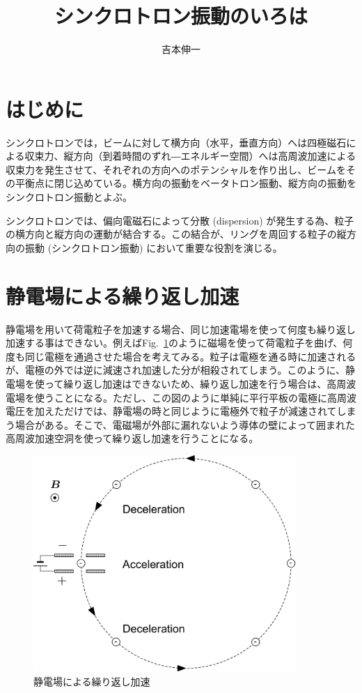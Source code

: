 \documentclass[10pt,a4paper]{ltjsarticle}
\begin{document}
\title{シンクロトロン振動のいろは}
\author{吉本伸一}
\maketitle
\tableofcontents
\clearpage

\section{はじめに}
シンクロトロンでは，ビームに対して横方向（水平，垂直方向）へは四極磁石による収束力、縦方向（到着時間のずれ―エネルギー空間）へは高周波加速による収束力を発生させて、それぞれの方向へのポテンシャルを作り出し、ビームをその平衡点に閉じ込めている。横方向の振動をベータトロン振動、縦方向の振動をシンクロトロン振動とよぶ。

シンクロトロンでは、偏向電磁石によって分散 (dispersion) が発生する為、粒子の横方向と縦方向の運動が結合する。この結合が、リングを周回する粒子の縦方向の振動 (シンクロトロン振動) において重要な役割を演じる。

\section{静電場による繰り返し加速}
静電場を用いて荷電粒子を加速する場合、同じ加速電場を使って何度も繰り返し加速する事はできない。例えばFig.~\ref{dc_circular}のように磁場を使って荷電粒子を曲げ、何度も同じ電極を通過させた場合を考えてみる。粒子は電極を通る時に加速されるが、電極の外では逆に減速され加速した分が相殺されてしまう。このように、静電場を使って繰り返し加速はできないため、繰り返し加速を行う場合は、高周波電場を使うことになる。ただし、この図のように単純に平行平板の電極に高周波電圧を加えただけでは、静電場の時と同じように電極外で粒子が減速されてしまう場合がある。そこで、電磁場が外部に漏れないよう導体の壁によって囲まれた高周波加速空洞を使って繰り返し加速を行うことになる。
%
\begin{figure}[hbt]
  \begin{center}
    \includegraphics[width=10cm,clip]{dc_circular.pdf}
    \caption{静電場による繰り返し加速}
   \label{dc_circular}
  \end{center}
\end{figure}
\end{document}
